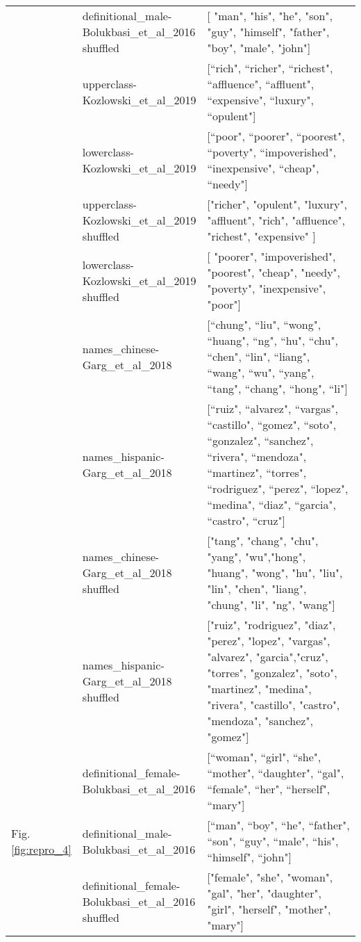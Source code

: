 \begin{longtable}[ht]{p{0.1\linewidth}p{0.3\linewidth}p{0.6\linewidth}}
 &
  definitional\_male-Bolukbasi\_et\_al\_2016 shuffled &
  {[} "man", "his", "he", "son", "guy", "himself", "father", "boy", "male", "john"{]} \\
 &
  upperclass-Kozlowski\_et\_al\_2019 &
  {[}``rich", ``richer", ``richest", ``affluence", ``affluent", ``expensive", ``luxury", ``opulent"{]} \\
 &
  lowerclass-Kozlowski\_et\_al\_2019 &
  {[}``poor", ``poorer", ``poorest", ``poverty", ``impoverished", ``inexpensive", ``cheap", ``needy"{]} \\
 &
  upperclass-Kozlowski\_et\_al\_2019 shuffled &
  {[}"richer", "opulent", "luxury", "affluent", "rich", "affluence", "richest", "expensive" {]} \\
 &
  lowerclass-Kozlowski\_et\_al\_2019 shuffled &
  {[} "poorer", "impoverished", "poorest", "cheap", "needy", "poverty", "inexpensive", "poor"{]} \\
 &
  names\_chinese-Garg\_et\_al\_2018 &
  {[}``chung", ``liu", ``wong", ``huang", ``ng", ``hu", ``chu", ``chen", ``lin", ``liang", ``wang", ``wu", ``yang", ``tang", ``chang", ``hong", ``li"{]} \\
 &
  names\_hispanic-Garg\_et\_al\_2018 &
  {[}``ruiz", ``alvarez", ``vargas", ``castillo", ``gomez", ``soto", ``gonzalez", ``sanchez", ``rivera", ``mendoza", ``martinez", ``torres", ``rodriguez", ``perez", ``lopez", ``medina", ``diaz", ``garcia", ``castro", ``cruz"{]} \\
 &
  names\_chinese-Garg\_et\_al\_2018 shuffled &
  {[}"tang", "chang", "chu", "yang", "wu","hong", "huang", "wong", "hu", "liu", "lin", "chen", "liang", "chung", "li", "ng", "wang"{]} \\
 &
  names\_hispanic-Garg\_et\_al\_2018 shuffled &
  {[}"ruiz", "rodriguez", "diaz", "perez", "lopez", "vargas", "alvarez", "garcia","cruz", "torres", "gonzalez", "soto", "martinez", "medina", "rivera", "castillo", "castro", "mendoza", "sanchez", "gomez"{]} \\ \midrule
\multirow{6}{*}{Fig. \ref{fig:repro_4}} &
  definitional\_female-Bolukbasi\_et\_al\_2016 &
  {[}``woman", ``girl", ``she", ``mother", ``daughter", ``gal", ``female", ``her", ``herself", ``mary"{]} \\
 &
  definitional\_male-Bolukbasi\_et\_al\_2016 &
  {[}``man", ``boy", ``he", ``father", ``son", ``guy", ``male", ``his", ``himself", ``john"{]} \\
 {Fig. \ref{fig:repro_4_3}} &
  definitional\_female-Bolukbasi\_et\_al\_2016 shuffled &
  {[}"female", "she", "woman", "gal", "her", "daughter", "girl", "herself", "mother", "mary"{]} \\

\end{longtable}
